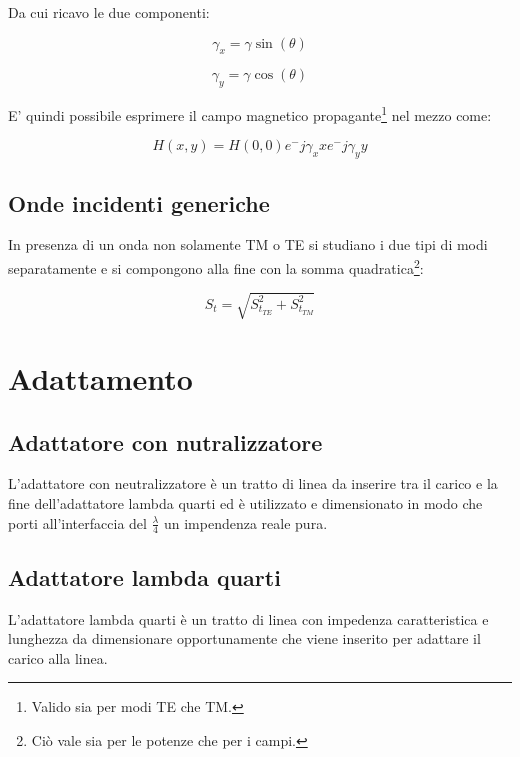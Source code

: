 \documentclass[10pt,a4paper]{report}
\begin{document}
			Da cui ricavo le due componenti:

			\begin{equation}
			\gamma_x=\gamma\sin(\theta)
			\end{equation}

			\begin{equation}
			\gamma_y=\gamma\cos(\theta)
			\end{equation}

			E' quindi possibile esprimere il campo magnetico propagante\footnote{Valido sia per modi TE che TM.} nel mezzo come:
			
			\begin{equation}
			H(x,y)=H(0,0)e^-{j\gamma_x x}e^-{j\gamma_y y}
			\end{equation}
		

		\section{Onde incidenti generiche}

		In presenza di un onda non solamente TM o TE si studiano i due tipi di modi separatamente e si compongono alla fine con la somma quadratica\footnote{Ciò vale sia per le potenze che per i campi.}:

		\begin{equation}
		S_{t}=\sqrt{S_{t_{TE}}^2 +S_{t_{TM}}^2 }
		\end{equation}

\chapter{Adattamento}

	\section{Adattatore con nutralizzatore}

		L'adattatore con neutralizzatore è un tratto di linea da inserire tra il carico e la fine dell'adattatore lambda quarti ed è utilizzato e dimensionato in modo che porti all'interfaccia del $\frac{\lambda}{4}$ un impendenza reale pura.

	\section{Adattatore lambda quarti}
		
		L'adattatore lambda quarti è un tratto di linea con impedenza caratteristica e lunghezza da dimensionare opportunamente che viene inserito per adattare il carico alla linea.
\end{document}
